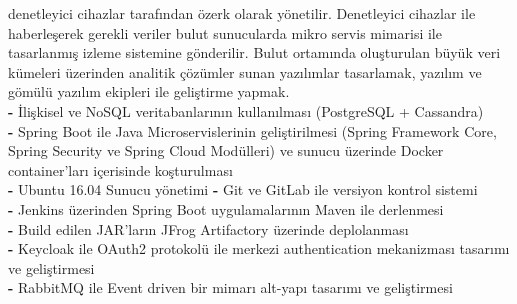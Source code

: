 \begin{multicols}{2}
{{{                denetleyici cihazlar tarafından özerk olarak yönetilir. Denetleyici cihazlar ile haberleşerek gerekli
                veriler bulut sunucularda mikro servis mimarisi ile tasarlanmış izleme sistemine gönderilir.
                Bulut ortamında oluşturulan büyük veri kümeleri üzerinden analitik çözümler sunan yazılımlar
                tasarlamak, yazılım ve gömülü yazılım ekipleri ile geliştirme yapmak. \\
                \textbf{-} İlişkisel ve NoSQL veritabanlarının kullanılması (PostgreSQL + Cassandra) \\
                \textbf{-} Spring Boot ile Java Microservislerinin geliştirilmesi
                (Spring Framework Core, Spring Security ve Spring Cloud Modülleri)
                ve sunucu üzerinde Docker container'ları içerisinde koşturulması \\
                \textbf{-} Ubuntu 16.04 Sunucu yönetimi
                \textbf{-} Git ve GitLab ile versiyon kontrol sistemi \\
                \textbf{-} Jenkins üzerinden Spring Boot uygulamalarının Maven ile derlenmesi \\
                \textbf{-} Build edilen JAR'ların  JFrog Artifactory üzerinde deplolanması \\
                \textbf{-} Keycloak ile OAuth2 protokolü ile merkezi authentication mekanizması tasarımı ve geliştirmesi  \\
                \textbf{-} RabbitMQ ile Event driven bir mimarı alt-yapı tasarımı ve geliştirmesi
            }
        }{
        }

}
\end{multicols}
